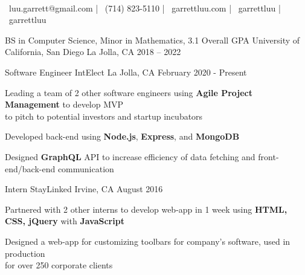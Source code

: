 \documentclass[]{awesome-cv}
\begin{document}
\begin{center}
	\vspace{-5mm}
	  \\
	\vspace{2mm}
  {\faEnvelope\ luu.garrett@gmail.com} | {\faMobile\ (714) 823-5110} |
  {\faLink\ garrettluu.com} |
  {\faGithub\ garrettluu} | {\faLinkedinSquare\ garrettluu}
\end{center}
\vspace{-3mm}
\begin{cventries}
	\cventry
	{BS in Computer Science, Minor in Mathematics, 3.1 Overall GPA}
	{University of California, San Diego}
	{La Jolla, CA}
	{2018 – 2022}
	{}
\end{cventries}

\vspace{-8mm}
\begin{cventries}
	\cventry
	{Software Engineer}
	{IntElect}
	{La Jolla, CA}
	{February 2020 - Present}
	{\begin{cvitems}
    \item {Leading a team of 2 other software engineers using \textbf{Agile
      Project Management} to develop MVP \\ to pitch to potential investors and
      startup incubators}
    \item {Developed back-end using \textbf{Node.js}, \textbf{Express}, and \textbf{MongoDB}}
    \item {Designed \textbf{GraphQL} API to increase efficiency of data fetching
      and front-end/back-end communication}
		\end{cvitems}}

	\vspace{-3mm}
	\cventry
	{Intern}
	{StayLinked}
	{Irvine, CA}
	{August 2016}
	{\begin{cvitems}
    \item {Partnered with 2 other interns to develop web-app in 1 week using
      \textbf{HTML, CSS, jQuery} with \textbf{JavaScript}}
		\item {Designed a web-app for customizing toolbars for company’s software,
      used in production\\ for over 250 corporate clients}
		\end{cvitems}}
\end{cventries}
\end{document}
